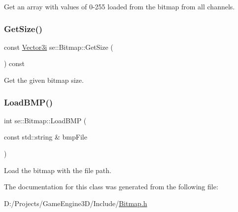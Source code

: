 Get an array with values of 0-\/255 loaded from the bitmap from all channels. \mbox{\label{classse_1_1_bitmap_a805adca2ccb528c6e694db84a51c7b66}} 
\subsubsection{\texorpdfstring{Get\+Size()}{GetSize()}}
{\footnotesize\ttfamily const \mbox{\hyperlink{namespacese_ada11715de7cf6e87b5dfb4611fe68d29}{Vector3i}} se\+::\+Bitmap\+::\+Get\+Size (\begin{DoxyParamCaption}{ }\end{DoxyParamCaption}) const}

Get the given bitmap size. \mbox{\label{classse_1_1_bitmap_a76c7fbaf5d2049af44abf83fe40a854d}} 
\subsubsection{\texorpdfstring{Load\+B\+M\+P()}{LoadBMP()}}
{\footnotesize\ttfamily int se\+::\+Bitmap\+::\+Load\+B\+MP (\begin{DoxyParamCaption}\item[{const std\+::string \&}]{bmp\+File }\end{DoxyParamCaption})}

Load the bitmap with the file path. 

The documentation for this class was generated from the following file\+:\begin{DoxyCompactItemize}
\item 
D\+:/\+Projects/\+Game\+Engine3\+D/\+Include/\mbox{\hyperlink{_bitmap_8h}{Bitmap.\+h}}\end{DoxyCompactItemize}
